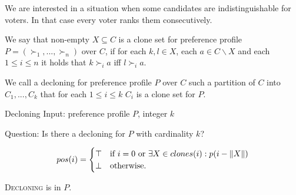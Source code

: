 We are interested in a situation when some candidates are indistinguishable for voters.
In that case every voter ranks them consecutively.

\begin{defn}
We say that non-empty $X \subseteq C$ is a clone set for preference profile $P = (\succ_1, ... , \succ_n)$ over $C$,
if for each $k,l \in X$, each $a \in C \backslash X$ and each $1 \leq i \leq n $ it holds that
$k \succ_i a$ iff $l \succ_i a$.
\end{defn}

\begin{defn}[decloning]
We call a decloning for preference profile $P$ over $C$
such a partition of $C$  into $C_1, ... , C_k$
that for each $1 \leq i \leq k$ $C_i$ is a clone set for $P$.
\end{defn}


\begin{problem}{Decloning}
    Input: preference profile $P$, integer $k$

    Question: Is there a decloning for $P$ with cardinality $k$?
\end{problem}

$$
pos(i) =
    \begin{cases}
        \top & \text{if $i=0$ or } \exists X \in clones(i): p(i - \left\|X\right\|) \\
        \bot & \text{otherwise.}
    \end{cases}
$$

\begin{thm}
\textsc{Decloning} is in $P$.
\end{thm}
